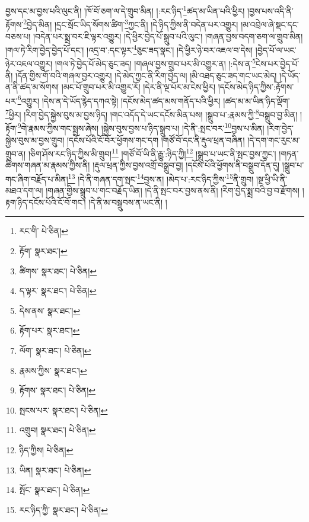 བྱས་དང་མ་བྱས་པའི་ལུང་ནི། །ཁོ་བོ་ཅག་ལ་དེ་གྲུབ་མིན། །:རང་ཉིད་\footnote{རང་གི་  པེ་ཅིན། }ཚད་མ་ཡིན་པའི་ཕྱིར། །བྱས་པས་འདི་ནི་རྟོགས་\footnote{རྟོག་  སྣར་ཐང་། }བྱེད་མིན། །དྲང་སྲོང་ཡིད་སོགས་ཚིག་\footnote{ཚིགས་  སྣར་ཐང་།  པེ་ཅིན། }ཀྱང་ནི། །དེ་ཉིད་ཀྱིས་ནི་བདེན་པར་འགྱུར། །མ་འབྲེལ་ཞེ་སྡང་དང་བཅས་པ། །བདེན་པར་སྨྲ་བར་ཇི་ལྟར་འགྱུར། །དེ་ཕྱིར་བྱེད་པོ་སྒྲུབ་པའི་ལུང་། །གཞན་བྱས་བདག་ཅག་ལ་གྲུབ་མིན། །གལ་ཏེ་རིག་བྱེད་བྱེད་པོ་དང་། །འདྲ་བ་:དང་ལྟར་\footnote{ད་ལྟར་  སྣར་ཐང་།  པེ་ཅིན། }ཅུང་ཟད་སྣང་། །དེ་ཕྱིར་ཉེ་བར་འཇལ་བ་དེས། །བྱེད་པོ་ལ་ཡང་ཉེར་འཇལ་འགྱུར། །གལ་ཏེ་བྱེད་པོ་མེད་ཅུང་ཟད། །གཞལ་བྱས་གྲུབ་པར་མི་འགྱུར་ན། །:དེས་ན་\footnote{དེས་ནས་  སྣར་ཐང་། }ངེས་པར་བྱེད་པོ་ནི། །དོན་གྱིས་གོ་བའི་གཞལ་བྱར་འགྱུར། །དེ་མེད་ཀྱང་ནི་རིག་བྱེད་ལ། །མི་འཐད་ཅུང་ཟད་གང་ཡང་མེད། །དེ་ཡོད་ན་ནི་ཚད་མ་སོགས། །མང་པོ་གྲུབ་པར་མི་འགྱུར་རོ། །དེར་ནི་ལྔ་པོར་མ་ངེས་ཕྱིར། །དངོས་མེད་ཉིད་ཀྱིས་:རྟོགས་པར་\footnote{རྟོག་པར་  སྣར་ཐང་། }འགྱུར། །དེས་ན་དེ་ཡོད་རྙེད་དཀའ་སྟེ། །དངོས་མེད་ཚད་མས་གནོད་པའི་ཕྱིར། །ཚད་མ་མ་ཡིན་ཉིད་ལྡོག་\footnote{ལོག་  སྣར་ཐང་།  པེ་ཅིན། }ཕྱིར། །རིག་བྱེད་སྐྱེས་བུས་མ་བྱས་ཉིད། །གང་འདོད་དེ་ཡང་དངོས་མིན་པས། །སྒྲུབ་པ་:རྣམས་ཀྱི་\footnote{རྣམས་ཀྱིས་  སྣར་ཐང་། }བསྒྲུབ་བྱ་མིན། །རྟོག་\footnote{རྟོགས་  སྣར་ཐང་།  པེ་ཅིན། }གེ་རྣམས་ཀྱིས་གང་སྨྲས་ཞེས། །སྐྱེས་བུས་བྱས་པ་ཉིད་སྒྲུབ་པ། །དེ་ནི་:སྤང་བར་\footnote{སྤངས་པར་  སྣར་ཐང་།  པེ་ཅིན། }བྱས་པ་མིན། །རིག་བྱེད་སྐྱེས་བུས་མ་བྱས་གྲུབ། །དངོས་པོའི་ངོ་བོར་ཕྱོགས་གང་དག །གཙོ་བོ་དང་ནི་རྡུལ་ཕྲན་བཞིན། །དེ་དག་གང་རུང་མ་གྲུབ་ན། །ཅིག་ཤོས་རང་ཉིད་ཀྱིས་མི་གྲུབ།\footnote{འགྲུབ།  སྣར་ཐང་།  པེ་ཅིན། } །གཙོ་བོ་ཡི་ནི་རྒྱུ་:ཉིད་ཀྱི།\footnote{ཉིད་ཀྱིས།  པེ་ཅིན། } །སྒྲུབ་པ་ཡང་ནི་སྤང་བྱས་ཀྱང་། །གཏན་ཚིགས་གཞན་མ་རྣམས་ཀྱིས་ནི། །རྡུལ་ཕྲན་ཀྱིས་བྱས་འགྲོ་བསྒྲུབ་བྱ། །དངོས་པོའི་ཕྱོགས་ནི་བསྒྲུབ་དོན་དུ། །སྒྲུབ་པ་གང་ཞིག་བརྗོད་པ་མིན།\footnote{ཡིན།  སྣར་ཐང་།  པེ་ཅིན། } །དེ་ནི་གཞན་དག་སྤང་\footnote{སྤོང་  སྣར་ཐང་།  པེ་ཅིན། }བྱས་ན། །མེད་པ་:རང་ཉིད་ཀྱིས་\footnote{རང་ཉིད་ཀྱི་  སྣར་ཐང་།  པེ་ཅིན། }ནི་གྲུབ། །སྔ་ཕྱི་ཡི་ནི་མཐའ་དག་ལ། །གཞན་གྱིས་སྒྲུབ་པ་གང་བརྗོད་ཡིན། །དེ་ནི་སྤང་བར་བྱས་ནས་ནི། །རིག་བྱེད་སྨྲ་བའི་བྱ་བ་རྫོགས། །རྟག་ཉིད་དངོས་པོའི་ངོ་བོ་གང་། །དེ་ནི་མ་བསྒྲུབས་ན་ཡང་ནི། །
